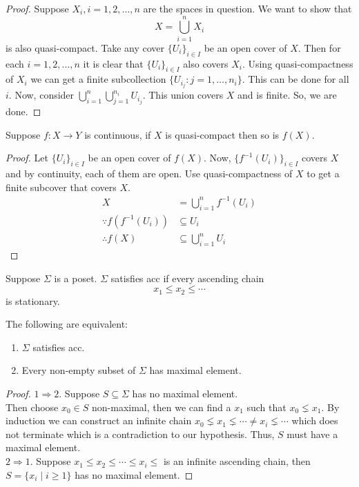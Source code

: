 \documentclass[oneside, 12pt]{scrbook}
\theoremstyle{theorem}
\begin{document}
\begin{proof}
Suppose $X_{i}, i =1,2,\hdots ,n$ are the spaces in question. We want to show that $$X = \bigcup_{i=1}^n X_{i}$$ is also quasi-compact. Take any cover $\{U_{i}\}_{i \in I}$  be an open cover of $X$. Then for each $i=1,2, \hdots , n$ it is clear that $\{U_{i}\}_{i \in I}$ also covers $X_{i}$. Using quasi-compactness of $X_{i}$ we can get a finite subcollection $\{U_{i_{j}}: j =1 , \hdots , n_{i}\}$. This can be done for all $i$. Now, consider $\bigcup_{i=1}^{n} \bigcup_{j=1}^{n_{i}} U_{i_{j}}$. This union covers $X$ and is finite. So, we are done. 
\end{proof}

\begin{lemma}
Suppose $f: X \rightarrow Y$ is continuous, if $X$ is quasi-compact then so is $f(X)$.
\end{lemma}

\begin{proof}
Let $\{U_{i}\}_{i \in I}$ be an open cover of $f(X)$. Now, $\{f^{-1}(U_{i})\}_{i \in I}$ covers $X$ and by continuity, each of them are open. Use quasi-compactness of $X$ to get a finite subcover that covers $X$.
\begin{align*}
X &= \bigcup_{i=1}^n f^{-1}(U_{i}) \\
\because f(f^{-1}(U_{i})) &\subseteq U_{i} \\
\therefore f(X) &\subseteq \bigcup_{i=1}^n U_{i} 
\end{align*}
\end{proof}

Suppose $\Sigma$ is a poset. $\Sigma$ satisfies acc if every ascending chain $$x_{1} \le x_{2} \le \cdots $$ is stationary.

\begin{lemma}
The following are equivalent: 
\begin{enumerate}
\item $\Sigma$ satisfies acc. 
\item Every non-empty subset of $\Sigma$ has maximal element.
\end{enumerate}
\end{lemma}

\begin{proof}
$1 \Rightarrow 2$. Suppose $S \subseteq \Sigma$ has no maximal element. \\
Then choose $x_{0} \in S$ non-maximal, then we can find a $x_{1}$ such that $x_{0} \lneq x_{1}$. By induction we can construct an infinite chain $x_{0} \lneq x_{1} \lneq \cdots \neq x_{i} \lneq \cdots$ which does not terminate which is a contradiction to our hypothesis. Thus, $S$ must have a maximal element.\\
$2 \Rightarrow 1$. Suppose $x_{1} \le x_{2} \le \cdots \le x_{i} \le $ is an infinite ascending chain, then $S = \{x_{i}\mid i \geq 1\}$ has no maximal element. 
\end{proof}
\end{document}
